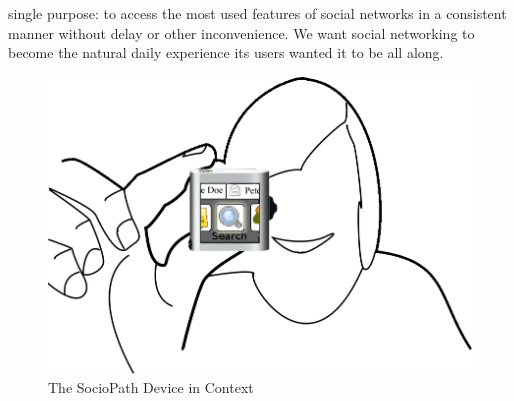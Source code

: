 single purpose: to access the 
most used features of social networks in a consistent manner without delay or other 
inconvenience. We want social networking to
become the natural daily experience its users wanted it to be all along.
\begin{figure}[h]
  \begin{center}
    \includegraphics[width=0.8\linewidth]{imgs/main.png}
  \end{center}
  \caption{The SocioPath Device in Context}
  \label{fig:main}
\end{figure}
